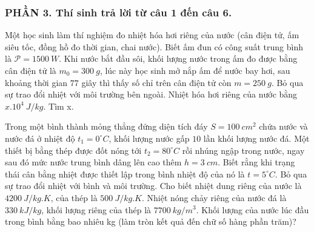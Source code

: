 \subsubsection*{PHẦN 3. Thí sinh trả lời từ câu 1 đến câu 6.}
\setcounter{ex}{0}
\begin{ex}%
	Một học sinh làm thí nghiệm đo nhiệt hóa hơi riêng của nước (cân điện tử, ấm siêu tốc, đồng hồ đo thời gian, chai nước). Biết ấm đun có công suất trung bình là $\mathcal{P}=1500\ W$. Khi nước bắt đầu sôi, khối lượng nước trong ấm đo được bằng cân điện tử là $m_0=300\ g$, lúc này học sinh mở nắp ấm để nước bay hơi, sau khoảng thời gian $77$ giây thì thấy số chỉ trên cân điện tử còn $m=250\ g$. Bỏ qua sự trao đổi nhiệt với môi trường bên ngoài. Nhiệt hóa hơi riêng của nước bằng $x.10^{4}\ J/kg$. Tìm x.
\end{ex}
\begin{ex}%
	Trong một bình thành mỏng thẳng đứng diện tích đáy $S=100\ cm^2$ chứa nước và nước đá ở nhiệt độ $t_1=0^\circ C$, khối lượng nước gấp $10$ lần khối lượng nước đá. Một thiết bị bằng thép được đốt nóng tới $t_2=80^\circ C$ rồi nhúng ngập trong nước, ngay sau đó mức nước trung bình dâng lên cao thêm $h=3\ cm$. Biết rằng khi trạng thái cân bằng nhiệt được thiết lập trong bình nhiệt độ của nó là $t=5^\circ C$. Bỏ qua sự trao đổi nhiệt với bình và môi trường. Cho biết nhiệt dung riêng của nước là $4200\ J/kg.K$, của thép là $500\ J/kg.K$. Nhiệt nóng chảy riêng của nước đá là $330\ kJ/kg$, khối lượng riêng của thép là $7700\ kg/m^3$. Khối lượng của nước lúc đầu trong bình bằng bao nhiêu kg (làm tròn kết quả đến chữ số hàng phần trăm)?
\end{ex}


